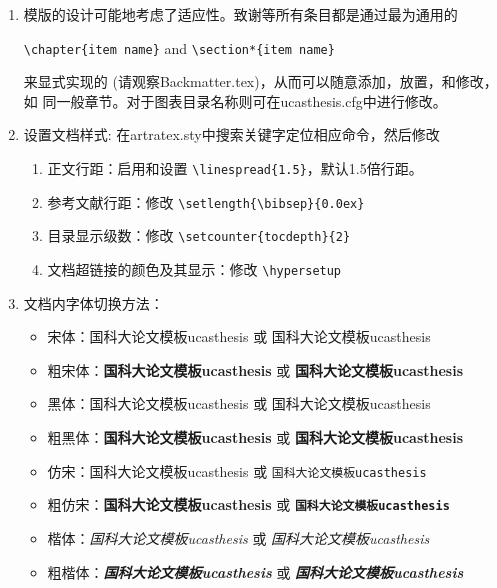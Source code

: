 \begin{enumerate}
    \item 模版的设计可能地考虑了适应性。致谢等所有条目都是通过最为通用的

        \verb+\chapter{item name}+  and \verb+\section*{item name}+

        来显式实现的 (请观察Backmatter.tex)，从而可以随意添加，放置，和修改，如
        同一般章节。对于图表目录名称则可在ucasthesis.cfg中进行修改。

    \item 设置文档样式: 在artratex.sty中搜索关键字定位相应命令，然后修改
        \begin{enumerate}
            \item 正文行距：启用和设置 \verb|\linespread{1.5}|，默认1.5倍行距。
            \item 参考文献行距：修改 \verb|\setlength{\bibsep}{0.0ex}|
            \item 目录显示级数：修改 \verb|\setcounter{tocdepth}{2}|
            \item 文档超链接的颜色及其显示：修改 \verb|\hypersetup|
        \end{enumerate}

    \item 文档内字体切换方法：
        \begin{itemize}
            \item 宋体：国科大论文模板ucasthesis 或 \textrm{国科大论文模板ucasthesis}
            \item 粗宋体：{\bfseries 国科大论文模板ucasthesis} 或 \textbf{国科大论文模板ucasthesis}
            \item 黑体：{\sffamily 国科大论文模板ucasthesis} 或 \textsf{国科大论文模板ucasthesis}
            \item 粗黑体：{\bfseries\sffamily 国科大论文模板ucasthesis} 或 \textsf{\bfseries 国科大论文模板ucasthesis}
            \item 仿宋：{\ttfamily 国科大论文模板ucasthesis} 或 \texttt{国科大论文模板ucasthesis}
            \item 粗仿宋：{\bfseries\ttfamily 国科大论文模板ucasthesis} 或 \texttt{\bfseries 国科大论文模板ucasthesis}
            \item 楷体：{\itshape 国科大论文模板ucasthesis} 或 \textit{国科大论文模板ucasthesis}
            \item 粗楷体：{\bfseries\itshape 国科大论文模板ucasthesis} 或 \textit{\bfseries 国科大论文模板ucasthesis}
        \end{itemize}


\end{enumerate}
